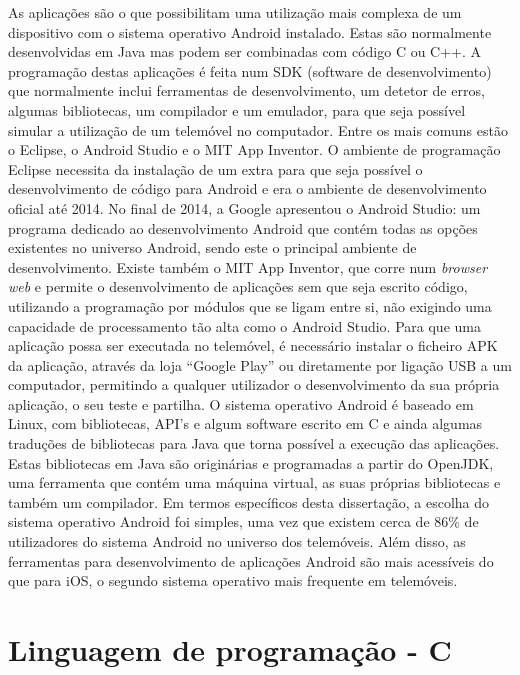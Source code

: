 As aplicações são o que possibilitam uma utilização mais complexa de um dispositivo com o sistema operativo Android instalado.
Estas são normalmente desenvolvidas em Java mas podem ser combinadas com código C ou C++.
A programação destas aplicações é feita num SDK (software de desenvolvimento) que normalmente inclui ferramentas de desenvolvimento, um detetor de erros, algumas bibliotecas, um compilador e um emulador, para que seja possível simular a utilização de um telemóvel no computador.
Entre os mais comuns estão o Eclipse, o Android Studio e o MIT App Inventor.
O ambiente de programação Eclipse necessita da instalação de um extra para que seja possível o desenvolvimento de código para Android e era o ambiente de desenvolvimento oficial até 2014.
No final de 2014, a Google apresentou o Android Studio: um programa dedicado ao desenvolvimento Android que contém todas as opções existentes no universo Android, sendo este o principal ambiente de desenvolvimento.
Existe também o MIT App Inventor, que corre num \emph{browser web} e permite o desenvolvimento de aplicações sem que seja escrito código, utilizando a programação por módulos que se ligam entre si, não exigindo uma capacidade de processamento tão alta como o Android Studio.
Para que uma aplicação possa ser executada no telemóvel, é necessário instalar o ficheiro APK da aplicação, através da loja ``Google Play'' ou diretamente por ligação USB a um computador, permitindo a qualquer utilizador o desenvolvimento da sua própria aplicação, o seu teste e partilha.
O sistema operativo Android é baseado em Linux, com bibliotecas, API's e algum software escrito em C e ainda algumas traduções de bibliotecas para Java que torna possível a execução das aplicações.
Estas bibliotecas em Java são originárias e programadas a partir do OpenJDK, uma ferramenta que contém uma máquina virtual, as suas próprias bibliotecas e também um compilador.
Em termos específicos desta dissertação, a escolha do sistema operativo Android foi simples, uma vez que existem cerca de 86\% de utilizadores do sistema Android no universo dos telemóveis.
Além disso, as ferramentas para desenvolvimento de aplicações Android são mais acessíveis do que para iOS, o segundo sistema operativo mais frequente em telemóveis.

\section{Linguagem de programação - C}
\label{sec:C}

